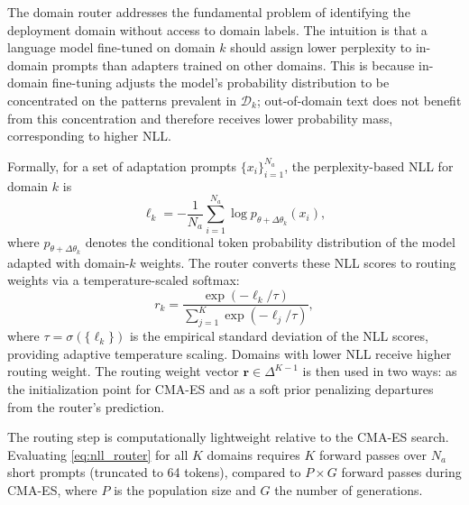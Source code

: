 \documentclass[preprint,12pt]{elsarticle}
\begin{document}
The domain router addresses the fundamental problem of identifying the
deployment domain without access to domain labels. The intuition is that
a language model fine-tuned on domain $k$ should assign lower perplexity
to in-domain prompts than adapters trained on other domains. This is because
in-domain fine-tuning adjusts the model's probability distribution to be
concentrated on the patterns prevalent in $\mathcal{D}_k$; out-of-domain text
does not benefit from this concentration and therefore receives lower
probability mass, corresponding to higher NLL.

Formally, for a set of adaptation prompts $\{x_i\}_{i=1}^{N_a}$, the
perplexity-based NLL for domain $k$ is
\begin{equation}
    \ell_k = -\frac{1}{N_a} \sum_{i=1}^{N_a}
    \log p_{\theta + \Delta\theta_k}(x_i),
    \label{eq:nll_router}
\end{equation}
where $p_{\theta + \Delta\theta_k}$ denotes the conditional token probability
distribution of the model adapted with domain-$k$ weights. The router converts
these NLL scores to routing weights via a temperature-scaled softmax:
\begin{equation}
    r_k = \frac{\exp(-\ell_k / \tau)}{\sum_{j=1}^{K} \exp(-\ell_j / \tau)},
    \label{eq:router_softmax}
\end{equation}
where $\tau = \sigma(\{\ell_k\})$ is the empirical standard deviation of the
NLL scores, providing adaptive temperature scaling. Domains with lower NLL
receive higher routing weight. The routing weight vector
$\mathbf{r} \in \Delta^{K-1}$ is then used in two ways: as the initialization
point for CMA-ES and as a soft prior penalizing departures from the router's
prediction.

The routing step is computationally lightweight relative to the CMA-ES search.
Evaluating \eqref{eq:nll_router} for all $K$ domains requires $K$ forward
passes over $N_a$ short prompts (truncated to 64 tokens), compared to
$P \times G$ forward passes during CMA-ES, where $P$ is the population size
and $G$ the number of generations.
\end{document}
